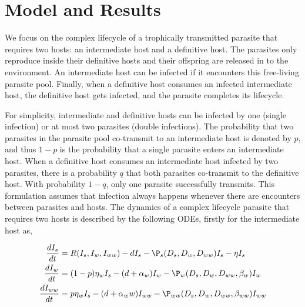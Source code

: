 \documentclass[11pt]{article}
\begin{document}
\section*{Model and Results}

We focus on the complex lifecycle of a trophically transmitted parasite that requires two hosts: an intermediate host and a definitive host. 
The parasites only reproduce inside their definitive hosts and their offspring are released in to the environment. An intermediate host can be infected if it encounters this free-living parasite pool. 
Finally, when a definitive host consumes an infected intermediate host, the definitive host gets infected, and the parasite completes its lifecycle.

For simplicity, intermediate and definitive hosts can be infected by one (single infection) or at most two parasites (double infections). 
The probability that two parasites in the parasite pool co-transmit to an intermediate host is denoted by  $p$, and thus $1-p$ is the probability that a single parasite enters an intermediate host. 
When a definitive host consumes an intermediate host infected by two parasites, there is a probability $q$ that both parasites co-transmit to the definitive host.
With probability $1-q$, only one parasite successfully transmits. 
This formulation assumes that infection always happens whenever there are encounters between parasites and hosts.
The dynamics of a complex lifecycle parasite that requires two hosts is described by the following ODEs, firstly for the intermediate host as,

\begin{align}
\frac{dI_s}{dt} &= R(I_s, I_w, I_{ww}) - d I_s - \P_s(D_s, D_w, D_{ww}) I_s  - \eta  I_s \nonumber \\ 
\frac{dI_w}{dt} &=  (1 - p) \eta_w I_s  - (d + \alpha_w) I_w - \P_w(D_s, D_w, D_{ww}, \beta_w) I_w \label{odes:ihosts} \\
\frac{dI_{ww}}{dt} &= p \eta_w I_s  - (d + \alpha_ww) I_{ww} - \P_{ww}(D_s, D_w, D_{ww}, \beta_{ww}) I_{ww} \nonumber
\end{align}
\end{document}
